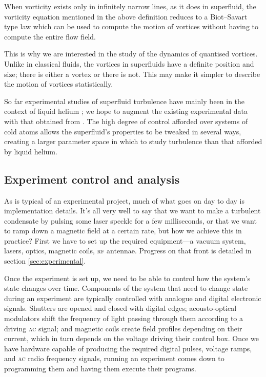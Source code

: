 When vorticity exists only in infinitely narrow lines, as it does in superfluid, the vorticity equation mentioned in the above definition reduces to a Biot--Savart type law which can be used to compute the motion of vortices without having to compute the entire flow field.

This is why we are interested in the study of the dynamics of quantised vortices. Unlike in classical fluids, the vortices in superfluids have a definite position and size; there is either a vortex or there is not. This may make it simpler to describe the motion of vortices statistically.

So far experimental studies of superfluid turbulence have mainly been in the context of liquid helium \cite{leggett_superfluidity_1999}; we hope to augment the existing experimental data with that obtained from \bec. The high degree of control afforded over systems of cold atoms allows the superfluid's properties to be tweaked in several ways, creating a larger parameter space in which to study turbulence than that afforded by liquid helium.

\subsection{Experiment control and analysis}

As is typical of an experimental project, much of what goes on day to day is implementation details. It's all very well to say that we want to make a turbulent condensate by pulsing some laser speckle for a few milliseconds, or that we want to ramp down a magnetic field at a certain rate, but how we achieve this in practice? First we have to set up the required equipment---a vacuum system, lasers, optics, magnetic coils, \textsc{rf} antennae. Progress on that front is detailed in section \ref{sec:experimental}.

Once the experiment is set up, we need to be able to control how the system's state changes over time. Components of the system that need to change state during an experiment are typically controlled with analogue and digital electronic signals. Shutters are opened and closed with digital edges; acousto-optical modulators shift the frequency of light passing through them according to a driving \textsc{ac} signal; and magnetic coils create field profiles depending on their current, which in turn depends on the voltage driving their control box. Once we have hardware capable of producing the required digital pulses, voltage ramps, and \textsc{ac} radio frequency signals, running an experiment comes down to programming them and having them execute their programs.

